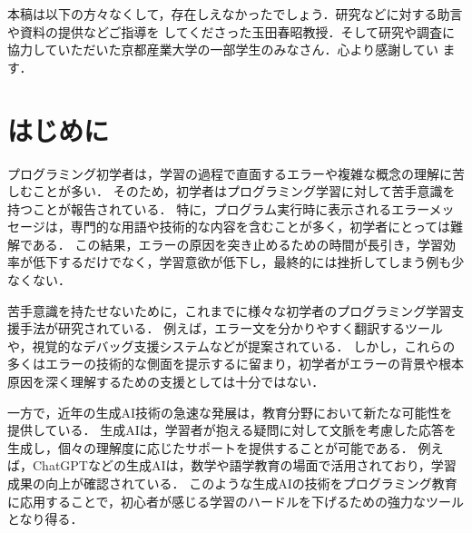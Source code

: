 \documentclass[12pt,twoside]{jbook}
\begin{document}
\begin{acknowledgments}
本稿は以下の方々なくして，存在しえなかったでしょう．研究などに対する助言や資料の提供などご指導を
してくださった玉田春昭教授．そして研究や調査に協力していただいた京都産業大学の一部学生のみなさん．心より感謝してい
ます．

\end{acknowledgments}


\tableofcontents       %

%
%

\listoffigures         %
\listoftables          %


%
%
\chapter{はじめに}

プログラミング初学者は，学習の過程で直面するエラーや複雑な概念の理解に苦しむことが多い．
そのため，初学者はプログラミング学習に対して苦手意識を持つことが報告されている\cite{2015icce_fu}．
特に，プログラム実行時に表示されるエラーメッセージは，専門的な用語や技術的な内容を含むことが多く，初学者にとっては難解である．
この結果，エラーの原因を突き止めるための時間が長引き，学習効率が低下するだけでなく，学習意欲が低下し，最終的には挫折してしまう例も少なくない\cite{2016ipsj_makihara}．

苦手意識を持たせないために，これまでに様々な初学者のプログラミング学習支援手法が研究されている\cite{2016ipsj_makihara,2021fose_akiyama}．
例えば，エラー文を分かりやすく翻訳するツールや，視覚的なデバッグ支援システムなどが提案されている\cite{2021fose_akiyama}．
しかし，これらの多くはエラーの技術的な側面を提示するに留まり，初学者がエラーの背景や根本原因を深く理解するための支援としては十分ではない．

一方で，近年の生成AI技術の急速な発展は，教育分野において新たな可能性を提供している\cite{2023jssst_tanaka}．
生成AIは，学習者が抱える疑問に対して文脈を考慮した応答を生成し，個々の理解度に応じたサポートを提供することが可能である．
例えば，ChatGPTなどの生成AIは，数学や語学教育の場面で活用されており，学習成果の向上が確認されている\cite{2023jssst_tanaka}．
このような生成AIの技術をプログラミング教育に応用することで，初心者が感じる学習のハードルを下げるための強力なツールとなり得る．
\end{document}
